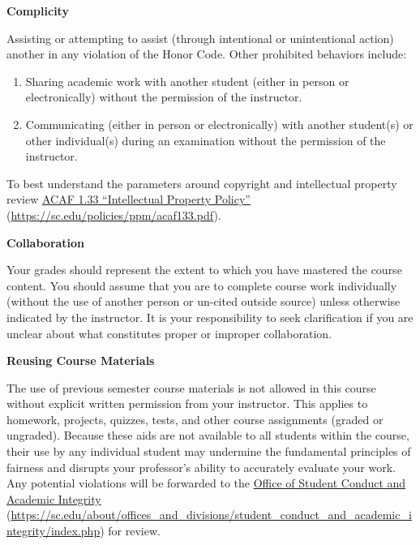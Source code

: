 \documentclass[11pt,letterpaper]{article}
\begin{document}
{\bfseries Complicity} \par
Assisting or attempting to assist (through intentional or unintentional action) another in any violation of the Honor Code. Other prohibited behaviors include:
	\begin{enumerate}[1.]
	\item Sharing academic work with another student (either in person or electronically) without the permission of the instructor.
	\item Communicating (either in person or electronically) with another student(s) or other individual(s) during an examination without the permission of the instructor.
	\end{enumerate}
To best understand the parameters around copyright and intellectual property review \href{https://sc.edu/policies/ppm/acaf133.pdf}{ACAF 1.33 ``Intellectual Property Policy''} (\url{https://sc.edu/policies/ppm/acaf133.pdf}). \par\vspace{0.3cm}

{\bfseries Collaboration} \par
Your grades should represent the extent to which you have mastered the course content. You should assume that you are to complete course work individually (without the use of another person or un-cited outside source) unless otherwise indicated by the instructor. It is your responsibility to seek clarification if you are unclear about what constitutes proper or improper collaboration. \par\vspace{0.3cm}

{\bfseries Reusing Course Materials} \par
The use of previous semester course materials is not allowed in this course without explicit written permission from your instructor. This applies to homework, projects, quizzes, tests, and other course assignments (graded or ungraded). Because these aids are not available to all students within the course, their use by any individual student may undermine the fundamental principles of fairness and disrupts your professor's ability to accurately evaluate your work. Any potential violations will be forwarded to the \href{https://sc.edu/about/offices\_and\_divisions/student\_conduct\_and\_academic\_integrity/index.php}{Office of Student Conduct and Academic Integrity} (\url{https://sc.edu/about/offices\_and\_divisions/student\_conduct\_and\_academic\_integrity/index.php}) for review. \sectionbreak
\end{document}
